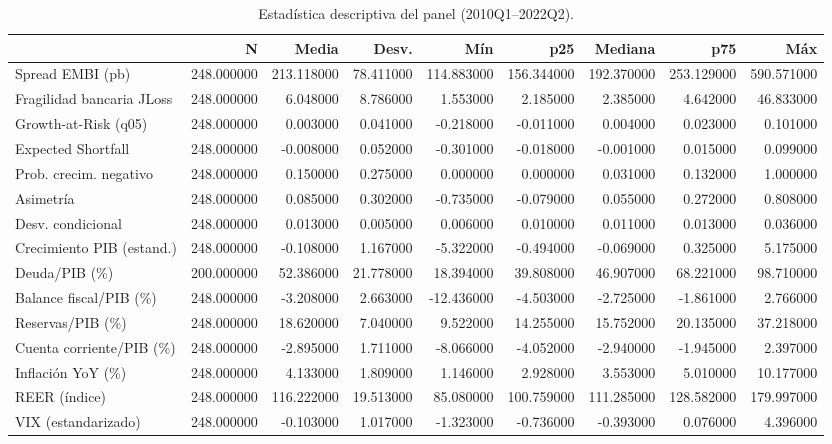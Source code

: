 \begin{table}
\caption{Estadística descriptiva del panel (2010Q1–2022Q2).}
\label{tab:desc}
\begin{tabular}{lrrrrrrrr}
\toprule
 & N & Media & Desv. & Mín & p25 & Mediana & p75 & Máx \\
\midrule
Spread EMBI (pb) & 248.000000 & 213.118000 & 78.411000 & 114.883000 & 156.344000 & 192.370000 & 253.129000 & 590.571000 \\
Fragilidad bancaria JLoss & 248.000000 & 6.048000 & 8.786000 & 1.553000 & 2.185000 & 2.385000 & 4.642000 & 46.833000 \\
Growth-at-Risk (q05) & 248.000000 & 0.003000 & 0.041000 & -0.218000 & -0.011000 & 0.004000 & 0.023000 & 0.101000 \\
Expected Shortfall & 248.000000 & -0.008000 & 0.052000 & -0.301000 & -0.018000 & -0.001000 & 0.015000 & 0.099000 \\
Prob. crecim. negativo & 248.000000 & 0.150000 & 0.275000 & 0.000000 & 0.000000 & 0.031000 & 0.132000 & 1.000000 \\
Asimetría & 248.000000 & 0.085000 & 0.302000 & -0.735000 & -0.079000 & 0.055000 & 0.272000 & 0.808000 \\
Desv. condicional & 248.000000 & 0.013000 & 0.005000 & 0.006000 & 0.010000 & 0.011000 & 0.013000 & 0.036000 \\
Crecimiento PIB (estand.) & 248.000000 & -0.108000 & 1.167000 & -5.322000 & -0.494000 & -0.069000 & 0.325000 & 5.175000 \\
Deuda/PIB (\%) & 200.000000 & 52.386000 & 21.778000 & 18.394000 & 39.808000 & 46.907000 & 68.221000 & 98.710000 \\
Balance fiscal/PIB (\%) & 248.000000 & -3.208000 & 2.663000 & -12.436000 & -4.503000 & -2.725000 & -1.861000 & 2.766000 \\
Reservas/PIB (\%) & 248.000000 & 18.620000 & 7.040000 & 9.522000 & 14.255000 & 15.752000 & 20.135000 & 37.218000 \\
Cuenta corriente/PIB (\%) & 248.000000 & -2.895000 & 1.711000 & -8.066000 & -4.052000 & -2.940000 & -1.945000 & 2.397000 \\
Inflación YoY (\%) & 248.000000 & 4.133000 & 1.809000 & 1.146000 & 2.928000 & 3.553000 & 5.010000 & 10.177000 \\
REER (índice) & 248.000000 & 116.222000 & 19.513000 & 85.080000 & 100.759000 & 111.285000 & 128.582000 & 179.997000 \\
VIX (estandarizado) & 248.000000 & -0.103000 & 1.017000 & -1.323000 & -0.736000 & -0.393000 & 0.076000 & 4.396000 \\
\bottomrule
\end{tabular}
\end{table}

